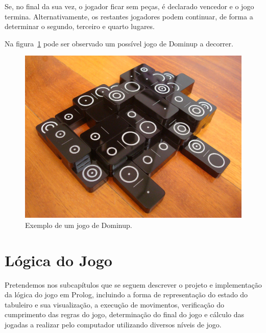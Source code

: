 \documentclass[a4paper]{article}
\begin{document}
Se, no final da sua vez, o jogador ficar sem peças, é declarado vencedor e o jogo termina. Alternativamente, os restantes jogadores podem continuar, de forma a determinar o segundo, terceiro e quarto lugares.

Na figura~\ref{example} pode ser observado um possível jogo de Dominup a decorrer.

\begin{figure}[htbp]
\begin{center}
\includegraphics[scale=0.4]{example.jpg}
\caption{Exemplo de um jogo de Dominup.}
\label{example}
\end{center}
\end{figure}



\section{Lógica do Jogo}

Pretendemos nos subcapítulos que se seguem descrever o projeto e implementação da lógica do jogo em Prolog, incluindo a forma de representação do estado do tabuleiro e sua visualização, a execução de movimentos, verificação do cumprimento das regras do jogo, determinação do final do jogo e cálculo das jogadas a realizar pelo computador utilizando diversos níveis de jogo. 
\end{document}
